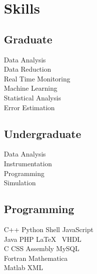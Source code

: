 \documentclass[a4paper]{deedy-resume} %
\begin{document}
\begin{minipage}[t]{0.35\textwidth}
\sectionspace %


\section{Skills}

\subsection{Graduate}

Data Analysis \\
Data Reduction \\
Real Time Monitoring \\
Machine Learning \\
Statistical Analysis \\
Error Estimation \\

\sectionspace %


\subsection{Undergraduate}

Data Analysis \\
Instrumentation \\
Programming \\
Simulation \\

\sectionspace %


\subsection{Programming}

C++ \textbullet{} Python \textbullet{} Shell \textbullet{} JavaScript \\
Java \textbullet{} PHP \textbullet{} \textbullet{} \LaTeX\ \textbullet{} VHDL \\ 
C \textbullet{} CSS \textbullet{} Assembly \textbullet{} MySQL \\
 Fortran \textbullet{} Mathematica \\
Matlab \textbullet{} XML


\end{minipage}
\end{document}

